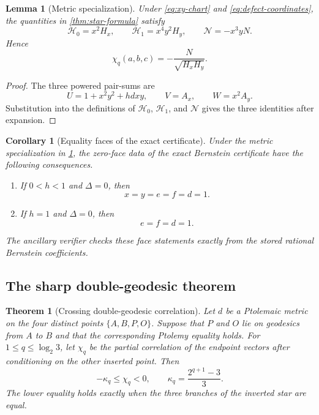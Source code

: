\documentclass[11pt]{amsart}
\newtheorem{theorem}{Theorem}[section]
\newtheorem{lemma}[lemma]{Lemma}
\newtheorem{corollary}[corollary]{Corollary}
\theoremstyle{definition}
\theoremstyle{remark}
\begin{document}
\begin{lemma}[Metric specialization]\label{lem:specialization}
Under \eqref{eq:xy-chart} and \eqref{eq:defect-coordinates}, the quantities in \cref{thm:star-formula} satisfy
\[
 \mathcal H_0=x^2H_x,
 \qquad
 \mathcal H_1=x^4y^2H_y,
 \qquad
 \mathcal N=-x^3yN.
\]
Hence
\begin{equation}\label{eq:chi-cube}
 \chi_q(a,b,c)=-\frac{N}{\sqrt{H_xH_y}}.
\end{equation}
\end{lemma}

\begin{proof}
The three powered pair-sums are
\[
 U=1+x^2y^2+hdxy,
 \qquad
 V=A_x,
 \qquad
 W=x^2A_y.
\]
Substitution into the definitions of \(\mathcal H_0\), \(\mathcal H_1\), and \(\mathcal N\) gives the three identities after expansion.
\end{proof}

\begin{corollary}[Equality faces of the exact certificate]\label{cor:cube-equality}
Under the metric specialization in \cref{lem:specialization}, the zero-face data of the exact Bernstein certificate have the following consequences.
\begin{enumerate}
 \item If \(0<h<1\) and \(\Delta=0\), then
 \[
  x=y=e=f=d=1.
 \]
 \item If \(h=1\) and \(\Delta=0\), then
 \[
  e=f=d=1.
 \]
\end{enumerate}
The ancillary verifier checks these face statements exactly from the stored rational Bernstein coefficients.
\end{corollary}

\subsection{The sharp double-geodesic theorem}

\begin{theorem}[Crossing double-geodesic correlation]\label{thm:double-geodesic}
Let \(d\) be a Ptolemaic metric on the four distinct points
\(\{A,B,P,O\}\). Suppose that \(P\) and \(O\) lie on geodesics from
\(A\) to \(B\) and that the corresponding Ptolemy equality holds. For
\(1\leq q\leq\log_2 3\), let \(\chi_q\) be the partial correlation of
the endpoint vectors after conditioning on the other inserted point. Then
\begin{equation}\label{eq:main-bound}
 -\kappa_q\leq\chi_q<0,
 \qquad
 \kappa_q=\frac{2^{q+1}-3}{3}.
\end{equation}
The lower equality holds exactly when the three branches of the inverted star are equal.
\end{theorem}
\end{document}
